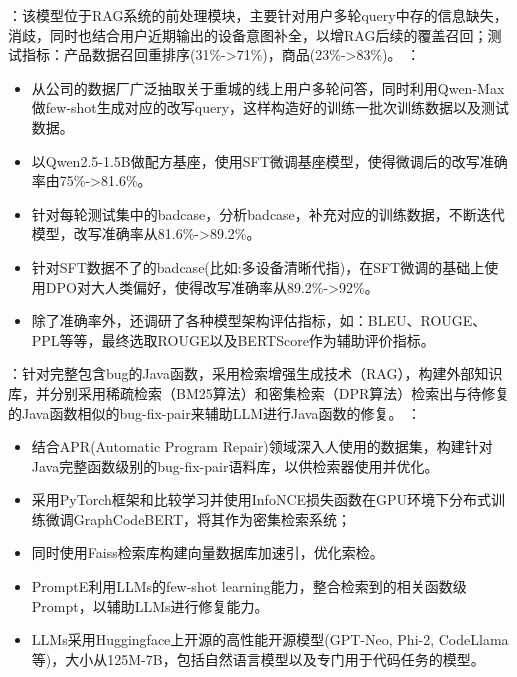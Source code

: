 \vspace{3pt}
：该模型位于RAG系统的前处理模块，主要针对用户多轮query中存的信息缺失，消歧，同时也结合用户近期输出的设备意图补全，以增RAG后续的覆盖召回；测试指标：产品数据召回重排序(31\%->71\%)，商品(23\%->83\%)。
\vspace{3pt}  
：
\begin{itemize}
  \item 从公司的数据厂广泛抽取关于重城的线上用户多轮问答，同时利用Qwen-Max做few-shot生成对应的改写query，这样构造好的训练一批次训练数据以及测试数据。
  \item 以Qwen2.5-1.5B做配方基座，使用SFT微调基座模型，使得微调后的改写准确率由75\%->81.6\%。
  \item 针对每轮测试集中的badcase，分析badcase，补充对应的训练数据，不断迭代模型，改写准确率从81.6\%->89.2\%。
  \item 针对SFT数据不了的badcase(比如:多设备清晰代指)，在SFT微调的基础上使用DPO对大人类偏好，使得改写准确率从89.2\%->92\%。
  \item 除了准确率外，还调研了各种模型架构评估指标，如：BLEU、ROUGE、PPL等等，最终选取ROUGE以及BERTScore作为辅助评价指标。
\end{itemize}

\vspace{5pt}
\vspace{1ex}
\vspace{3pt}
：针对完整包含bug的Java函数，采用检索增强生成技术（RAG），构建外部知识库，并分别采用稀疏检索（BM25算法）和密集检索（DPR算法）检索出与待修复的Java函数相似的bug-fix-pair来辅助LLM进行Java函数的修复。
\vspace{3pt}
：
\begin{itemize}
  \item 结合APR(Automatic Program Repair)领域深入人使用的数据集，构建针对Java完整函数级别的bug-fix-pair语料库，以供检索器使用并优化。
  \item 采用PyTorch框架和比较学习并使用InfoNCE损失函数在GPU环境下分布式训练微调GraphCodeBERT，将其作为密集检索系统；
  \item 同时使用Faiss检索库构建向量数据库加速引，优化索检。
  \item PromptE利用LLMs的few-shot learning能力，整合检索到的相关函数级Prompt，以辅助LLMs进行修复能力。
  \item LLMs采用Huggingface上开源的高性能开源模型(GPT-Neo, Phi-2, CodeLlama等)，大小从125M-7B，包括自然语言模型以及专门用于代码任务的模型。
\end{itemize}

